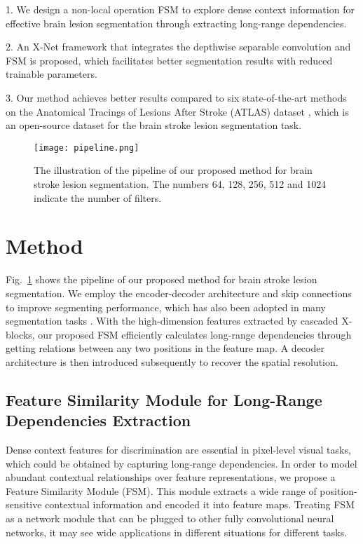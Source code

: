 \documentclass[runningheads]{llncs}
\begin{document}
1.	We design a non-local operation FSM to explore dense context information for effective brain lesion segmentation through extracting long-range dependencies.

2.	An X-Net framework that integrates the depthwise separable convolution and FSM is proposed, which facilitates better segmentation results with reduced trainable parameters.

3.	Our method achieves better results compared to six state-of-the-art methods on the Anatomical Tracings of Lesions After Stroke (ATLAS) dataset \cite{[2]}, which is an open-source dataset for the brain stroke lesion segmentation task.

\begin{figure}
	\texttt{[image: pipeline.png]}
	\caption{The illustration of the pipeline of our proposed method for brain stroke lesion segmentation. The numbers 64, 128, 256, 512 and 1024 indicate the number of filters.} \label{pipeline}
\end{figure}

\section{Method}
Fig.~\ref{pipeline} shows the pipeline of our proposed method for brain stroke lesion segmentation. We employ the encoder-decoder architecture and skip connections to improve segmenting performance, which has also been adopted in many segmentation tasks \cite{[3],[4],[5],[6],[7],[8]}. With the high-dimension features extracted by cascaded X-blocks, our proposed FSM efficiently calculates long-range dependencies through getting relations between any two positions in the feature map. A decoder architecture is then introduced subsequently to recover the spatial resolution.

\subsection{Feature Similarity Module for Long-Range Dependencies Extraction}
Dense context features for discrimination are essential in pixel-level visual tasks, which could be obtained by capturing long-range dependencies. In order to model abundant contextual relationships over feature representations, we propose a Feature Similarity Module (FSM). This module extracts a wide range of position-sensitive contextual information and encoded it into feature maps. Treating FSM as a network module that can be plugged to other fully convolutional neural networks, it may see wide applications in different situations for different tasks.
\end{document}
